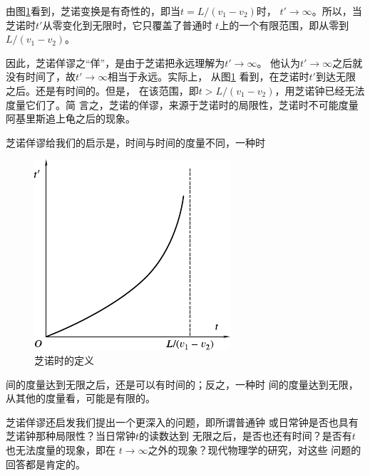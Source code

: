 由图\ref{fig:01.03}看到，芝诺变换是有奇性的，即当$t=L/\left(v_1-v_2\right)$时，
$t'\rightarrow\infty$。所以，当芝诺时$t'$从零变化到无限时，它只覆盖了普通时
$t$上的一个有限范围，即从零到$ L/\left(v_1-v_2\right) $。

因此，芝诺佯谬之“佯”，是由于芝诺把永远理解为$t'\rightarrow\infty$。
他认为$t'\rightarrow\infty$之后就没有时间了，故$t'\rightarrow\infty$相当于永远。实际上，
从图\ref{fig:01.03} 看到，在芝诺时$ t' $到达无限之后。还是有时间的。但是，
在该范围，即$ t>L/\left(v_1-v_2\right) $，用芝诺钟已经无法度量它们了。简
言之，芝诺的佯谬，来源于芝诺时的局限性，芝诺时不可能度量
阿基里斯追上龟之后的现象。

芝诺佯谬给我们的启示是，时间与时间的度量不同，一种时

\begin{figure}
  \includegraphics{figure/fig01.03}
  \caption{芝诺时的定义}\label{fig:01.03}
\end{figure}
\noindent 间的度量达到无限之后，还是可以有时间的；反之，一种时
间的度量达到无限，从其他的度量看，可能是有限的。

芝诺佯谬还启发我们提出一个更深入的问题，即所谓普通钟
或日常钟是否也具有芝诺钟那种局限性？当日常钟$t$的读数达到
无限之后，是否也还有时间？是否有$t$也无法度量的现象，即在
$t\rightarrow\infty$之外的现象？现代物理学的研究，对这些
问题的回答都是肯定的。
